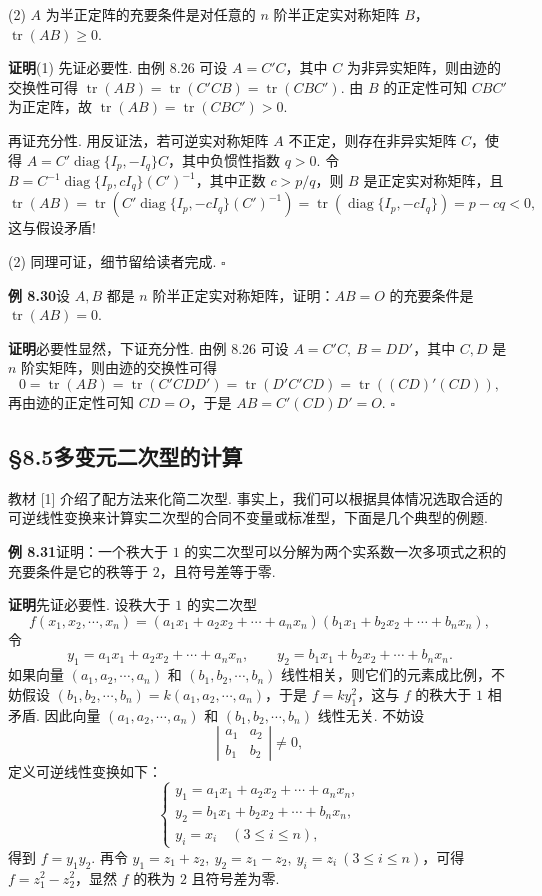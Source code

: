 \documentclass[UTF8,12pt,a4paper,fontset=fandol]{ctexart}
\begin{document}
(2) $A$ 为半正定阵的充要条件是对任意的 $n$ 阶半正定实对称矩阵 $B$，$\operatorname{tr}(AB)\ge 0$.

\noindent\textbf{证明}\quad (1) 先证必要性. 由例 8.26 可设 $A=C'C$，其中 $C$ 为非异实矩阵，则由迹的交换性可得 $\operatorname{tr}(AB)=\operatorname{tr}(C'CB)=\operatorname{tr}(CBC')$. 由 $B$ 的正定性可知 $CBC'$ 为正定阵，故 $\operatorname{tr}(AB)=\operatorname{tr}(CBC')>0$.

再证充分性. 用反证法，若可逆实对称矩阵 $A$ 不正定，则存在非异实矩阵 $C$，使得 $A=C'\operatorname{diag}\{I_p,-I_q\}C$，其中负惯性指数 $q>0$. 令 $B=C^{-1}\operatorname{diag}\{I_p,cI_q\}(C')^{-1}$，其中正数 $c>p/q$，则 $B$ 是正定实对称矩阵，且
\[
\operatorname{tr}(AB)=\operatorname{tr}\left(C'\operatorname{diag}\{I_p,-cI_q\}(C')^{-1}\right)
=\operatorname{tr}(\operatorname{diag}\{I_p,-cI_q\})=p-cq<0,
\]
这与假设矛盾!

(2) 同理可证，细节留给读者完成. $\ensuremath{\square}$

\noindent\textbf{例 8.30}\quad 设 $A,B$ 都是 $n$ 阶半正定实对称矩阵，证明：$AB=O$ 的充要条件是 $\operatorname{tr}(AB)=0$.

\noindent\textbf{证明}\quad 必要性显然，下证充分性. 由例 8.26 可设 $A=C'C,\ B=DD'$，其中 $C,D$ 是 $n$ 阶实矩阵，则由迹的交换性可得
\[
0=\operatorname{tr}(AB)=\operatorname{tr}(C'CDD')=\operatorname{tr}(D'C'CD)=\operatorname{tr}((CD)'(CD)),
\]
再由迹的正定性可知 $CD=O$，于是 $AB=C'(CD)D'=O$. $\ensuremath{\square}$

\subsection*{§8.5\quad 多变元二次型的计算}

教材 [1] 介绍了配方法来化简二次型. 事实上，我们可以根据具体情况选取合适的可逆线性变换来计算实二次型的合同不变量或标准型，下面是几个典型的例题.

\noindent\textbf{例 8.31}\quad 证明：一个秩大于 $1$ 的实二次型可以分解为两个实系数一次多项式之积的充要条件是它的秩等于 $2$，且符号差等于零.

\noindent\textbf{证明}\quad 先证必要性. 设秩大于 $1$ 的实二次型
\[
f(x_1,x_2,\cdots,x_n)=(a_1x_1+a_2x_2+\cdots+a_nx_n)(b_1x_1+b_2x_2+\cdots+b_nx_n),
\]
令
\[
y_1=a_1x_1+a_2x_2+\cdots+a_nx_n,\qquad
y_2=b_1x_1+b_2x_2+\cdots+b_nx_n.
\]
如果向量 $(a_1,a_2,\cdots,a_n)$ 和 $(b_1,b_2,\cdots,b_n)$ 线性相关，则它们的元素成比例，不妨假设 $(b_1,b_2,\cdots,b_n)=k(a_1,a_2,\cdots,a_n)$，于是 $f=ky_1^2$，这与 $f$ 的秩大于 $1$ 相矛盾. 因此向量 $(a_1,a_2,\cdots,a_n)$ 和 $(b_1,b_2,\cdots,b_n)$ 线性无关. 不妨设
\[
\left|\begin{array}{cc}
a_1 & a_2\\
b_1 & b_2
\end{array}\right|\ne 0,
\]
定义可逆线性变换如下：
\[
\left\{\begin{array}{l}
y_1=a_1x_1+a_2x_2+\cdots+a_nx_n,\\
y_2=b_1x_1+b_2x_2+\cdots+b_nx_n,\\
y_i=x_i\quad (3\le i\le n),
\end{array}\right.
\]
得到 $f=y_1y_2$. 再令 $y_1=z_1+z_2,\ y_2=z_1-z_2,\ y_i=z_i\ (3\le i\le n)$，可得 $f=z_1^2-z_2^2$，显然 $f$ 的秩为 $2$ 且符号差为零.
\end{document}
